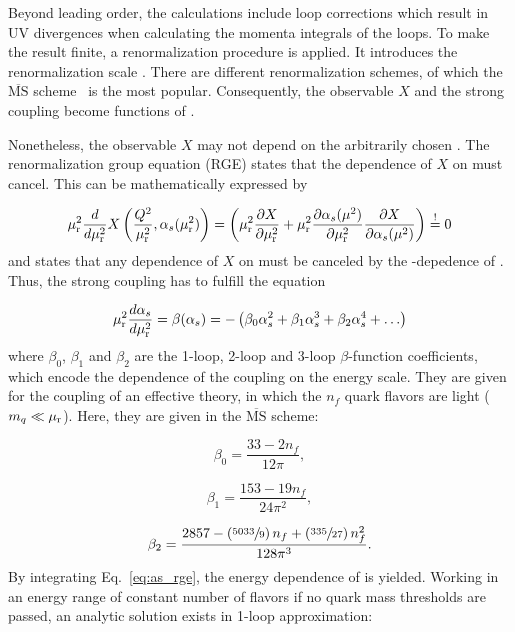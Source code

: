 Beyond leading order, the calculations include loop corrections which result in
UV divergences when calculating the momenta integrals of the loops. To make the
result finite, a renormalization procedure is applied. It introduces the
renormalization scale \mur. There are different renormalization schemes, of
which the $\overline{\mathrm{MS}}$ scheme~\cite{Weinberg:1951ss,tHooft:1973mm}
is the most popular. Consequently, the observable $X$ and the strong coupling
become functions of \mur. 

Nonetheless, the observable $X$ may not depend on the arbitrarily chosen \mur.
The renormalization group equation (RGE) states that the dependence of $X$ on
\mur must cancel. This can be mathematically expressed by

\begin{equation*} 
    \mu_{\mathrm{r}}^2 \frac{d}{d \mu_{\mathrm{r}}^2} X \left(\frac{Q^2}{\mu_{\mathrm{r}}^2},\alpha_{s}(\mu_{\mathrm{r}}^2)\right) = \left(
    \mu_{\mathrm{r}}^2 \frac{\partial X}{\partial \mu_{\mathrm{r}}^2} + \mu_{\mathrm{r}}^2 \frac{\partial
    \alpha_{s}(\mu^2)}{\partial \mu_{\mathrm{r}}^2} \frac{\partial X}{\partial \alpha_{s}(\mu^2)} \right) \stackrel{!}{=} 0 
\end{equation*}
%
and states that any dependence of $X$ on \mur must be canceled by the
\mur-depedence of \as. Thus, the strong coupling has to fulfill the
equation

\begin{equation*}
    \mu_{\mathrm{r}}^2 \frac{d \alpha_{s}}{d \mu_{\mathrm{r}}^2} = \beta(\alpha_{s}) = - \left( \beta_0 \alpha_{s}^2 + \beta_1 \alpha_{s}^3
    + \beta_2 \alpha_{s}^4 + \ldots \right)
    \label{eq:as_rge}
\end{equation*}
%
where $\beta_0$, $\beta_1$ and $\beta_2$ are the 1-loop, 2-loop and 3-loop 
$\beta$-function coefficients, which encode the dependence of the coupling
on the energy scale. They are given for the coupling of an effective
theory, in which the $n_f$ quark flavors are light ($m_q \ll \mu_{\mathrm{r}}$). Here, they
are given in the $\overline{\mathrm{MS}}$ scheme:

\begin{equation*} 
    \beta_0 = \frac{33 - 2 n_f}{12\pi},
\end{equation*}

\begin{equation*} 
    \beta_1 = \frac{153 - 19 n_f}{24\pi^2},
\end{equation*}

\begin{equation*} 
   \beta_2 = \frac{2857 -\left(\sfrac{5033}{9}\right)n_f + \left(\sfrac{335}{27}
   \right)n_f^2}{128 \pi^3}.
\end{equation*}
%
By integrating Eq.~\ref{eq:as_rge}, the energy dependence of \as is yielded.
Working in an energy range of constant number of flavors \ie if no quark mass
thresholds are passed, an analytic solution exists in 1-loop approximation:


